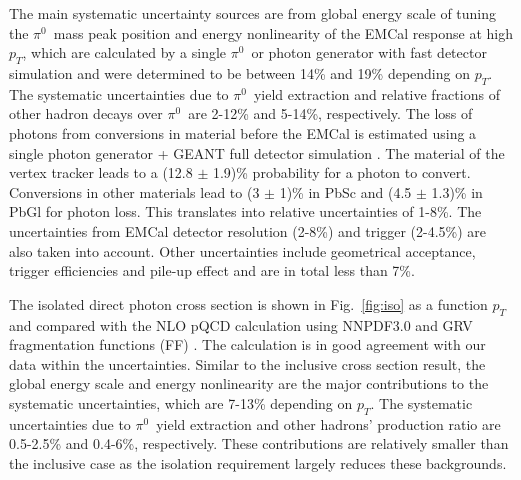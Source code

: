 \documentclass[twocolumn,letterpaper,aps,prl,longbibliography,superscriptaddress,floatfix]{revtex4-2}
\newcommand{\pT}{\ensuremath{p_T}}
\newcommand{\pizero}{\ensuremath{\pi^0}}
\begin{document}
The main systematic uncertainty sources are from global energy scale of tuning the \pizero\ mass peak position and energy nonlinearity of the EMCal response at high \pT, which are calculated by a single \pizero\ or photon generator with fast detector simulation and were determined to be between 14\% and 19\% depending on \pT. The systematic uncertainties due to \pizero\ yield extraction and relative fractions of other hadron decays over \pizero\ are 2-12\% and 5-14\%, respectively. The loss of photons from conversions in material before the EMCal is estimated using a single photon generator + GEANT full detector simulation \cite{Brun:1994aa}. The material of the vertex tracker \cite{SONDHEIM2012993} leads to a (12.8 $\pm$ 1.9)\% probability for a photon to convert. Conversions in other materials lead to (3 $\pm$ 1)\% in PbSc and (4.5 $\pm$ 1.3)\% in PbGl for photon loss. This translates into relative uncertainties of 1-8\%. The uncertainties from EMCal detector resolution (2-8\%) and trigger (2-4.5\%) are also taken into account. Other uncertainties include geometrical acceptance, trigger efficiencies and pile-up effect and are in total less than 7\%.

The isolated direct photon cross section is shown in Fig.~\ref{fig:iso} as a function \pT and compared with the NLO pQCD calculation \cite{PhysRevD.48.3136,PhysRevD.50.1901} using NNPDF3.0 \cite{Ball2015,Bonvini2015} and GRV fragmentation functions (FF) \cite{PhysRevD.45.3986}. The calculation is in good agreement with our data within the uncertainties. Similar to the inclusive cross section result, the global energy scale and energy nonlinearity are the major contributions to the systematic uncertainties, which are 7-13\% depending on \pT. The systematic uncertainties due to \pizero\ yield extraction and other hadrons' production ratio are 0.5-2.5\% and 0.4-6\%, respectively. These contributions are relatively smaller than the inclusive case as the isolation requirement largely reduces these backgrounds.
\end{document}
